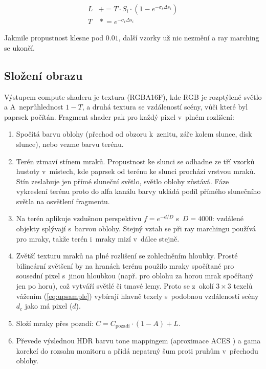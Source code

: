 \documentclass[a4paper, 12pt]{article}
\begin{document}
\begin{equation}
  \begin{aligned}
    L & \mathrel{+}= T \cdot S_i \cdot \left(1 - e^{-\sigma_t \Delta s_i}\right) \\
    T & \mathrel{*}= e^{-\sigma_t \Delta s_i}
  \end{aligned}
  \label{eq:integration}
\end{equation}

Jakmile propustnost klesne pod $0.01$, další vzorky už nic nezmění
a ray marching se ukončí.

\subsection{Složení obrazu}

Výstupem compute shaderu je textura (RGBA16F), kde RGB je rozptýlené světlo
a A~neprůhlednost $1 - T$, a druhá textura se vzdáleností scény, vůči které
byl paprsek počítán. Fragment shader pak pro každý pixel v~plném rozlišení:

\begin{enumerate}
  \item Spočítá barvu oblohy (přechod od obzoru k~zenitu, záře kolem slunce,
    disk slunce), nebo vezme barvu terénu.
  \item Terén ztmaví stínem mraků. Propustnost ke slunci se odhadne ze tří
    vzorků hustoty v~místech, kde paprsek od terénu ke slunci prochází vrstvou
    mraků. Stín zeslabuje jen přímé sluneční světlo, světlo oblohy zůstává.
    Fáze vykreslení terénu proto do alfa kanálu barvy ukládá podíl přímého
    slunečního světla na osvětlení fragmentu.
  \item Na terén aplikuje vzdušnou perspektivu $f = e^{-d/D}$ s~$D = 4000$:
    vzdálené objekty splývají s~barvou oblohy. Stejný vztah se při ray marchingu
    používá pro mraky, takže terén i~mraky mizí v~dálce stejně.
  \item Zvětší texturu mraků na plné rozlišení se zohledněním hloubky.
    Prosté bilineární zvětšení by na hranách terénu použilo mraky
    spočítané pro sousední pixel s~jinou hloubkou (např. pro oblohu za
    horou mrak spočítaný jen po horu), což vytváří světlé či tmavé lemy.
    Proto se z~okolí $3 \times 3$ texelů vážením (\ref{eq:upsample}) vybírají
    hlavně texely s~podobnou vzdáleností scény $d_c$ jako má pixel ($d$).
  \item Složí mraky přes pozadí: $C = C_{\text{pozadí}} \cdot (1 - A) + L$.
  \item Převede výslednou HDR barvu tone mappingem (aproximace ACES
    \cite{url:narkowicz-aces}) a gama korekcí do rozsahu monitoru a přidá
    nepatrný šum proti pruhům v~přechodu oblohy.
\end{enumerate}
\end{document}

